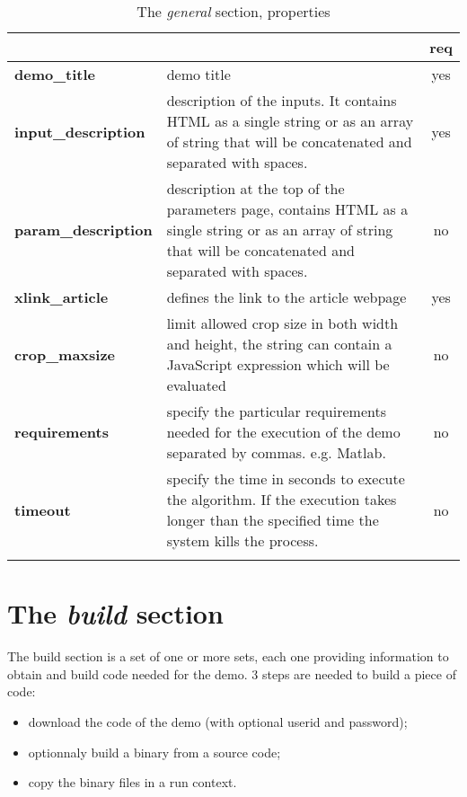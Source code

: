 % 
\begin{longtable}{|>{\bf}L{\linewidth}|L{\linewidth}|c|}
\hline
      &  & {\bf req} 
\tabularnewline \hline \hline
 demo\_title         & demo title & yes\\ \hline
 input\_description  & description of the inputs. 
                      It contains HTML as a single string or as an array of string
                      that will be concatenated and separated with spaces.
                     & yes \\ \hline
 param\_description  & description at the top of the para\-meters page,
                      contains HTML as a single string or as an array of string
                      that will be concatenated and separated with spaces.
                      & no
                      \\ \hline
 xlink\_article     & defines the link to the article webpage & yes  \\ \hline
 crop\_maxsize      & limit allowed crop size in both width and height, the string
                      can contain a JavaScript expression which will be evaluated & no \\ \hline
 requirements 	    & specify the particular requirements needed for the execution of the demo separated by commas. e.g. Matlab. & no \\ \hline
 timeout 	    & specify the time in seconds to execute the algorithm. If the execution takes longer than the specified time 
		      the system kills the process.& no \\ \hline
\caption{The \emph{general} section, properties}
\end{longtable}

\section{The \emph{build} section}

The build section is a set of one or more sets,
each one providing information to obtain and build code needed for the demo.
3 steps are needed to build a piece of code: 

\begin{itemize}
  \item download the code of the demo (with optional userid and password);
  \item optionnaly build a binary from a source code;
  \item copy the binary files in a run context.
\end{itemize}



